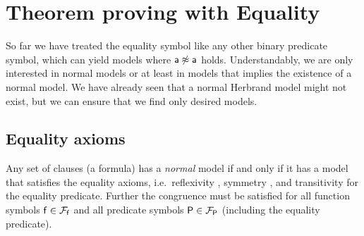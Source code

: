 \section{Theorem proving with Equality}\label{sec:theorem:proving:with:equality}

So far we have treated the equality symbol like any other binary predicate symbol,
which can yield models where \( \mathsf{a}\not\approx\mathsf{a} \) holds.
Understandably, we are only interested in normal models or
at least in models that implies the existence of a normal model.
We have already seen that a normal Herbrand model might not exist,
but we can ensure that we find only desired models.

\subsection{Equality axioms}\label{sec:equality:axioms}

\begin{theorem}\cite{Harrison:2009:HPL:1540610}
	Any set of clauses (a formula) has a \emph{normal} model
	if and only if it has a model that satisfies the
	{ equality axioms}, 
	i.e.~reflexivity , 
	symmetry , and
	transitivity  for the equality predicate.
	Further the congruence  must be satisfied 
	for all function symbols \( \mathsf{f}\in{\mathcal{F}_{\mathsf{f}}} \)
	and all predicate symbols \( \mathsf{P}\in{\mathcal{F}_{\mathsf{P}}} \) 
	(including the equality predicate).
\end{theorem}

